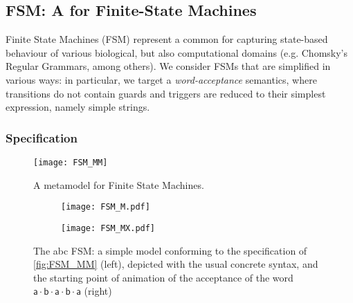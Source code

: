 \subsection{\textsf{FSM}: A \DSL for Finite-State Machines}
\label{sec:Examples:FSM}

Finite State Machines (FSM) represent a common \DSL for capturing state-based 
behaviour of various biological, but also computational domains (e.g. Chomsky's 
Regular Grammars, among others). We consider
FSMs that are simplified in various ways: in particular, we target a
\emph{word-acceptance} semantics, where transitions do not contain guards and 
triggers are reduced to their simplest expression, namely simple strings.

\subsubsection{Specification}
\label{sec:Examples:FSM:Specification}

\begin{figure}[t]%
   \centering
   \texttt{[image: FSM\_MM]}%
   \caption{A metamodel for Finite State Machines.}%
   \label{fig:FSM_MM}%
\end{figure}

\begin{figure}[t]%
   \centering
   \begin{subfigure}[b]{0.45\columnwidth}
      \centering
      \texttt{[image: FSM\_M.pdf]}%
   \end{subfigure}
   \hfill
   \begin{subfigure}[b]{0.45\columnwidth}
      \centering
      \texttt{[image: FSM\_MX.pdf]}%
   \end{subfigure}
  \caption{The \textsf{abc} FSM: a simple model conforming to the specification
   of \autoref{fig:FSM_MM} (left), depicted with the usual concrete syntax, and 
   the starting point of animation of the acceptance of the word 
   $\mathsf{a\cdot b \cdot a \cdot b \cdot a}$ (right)}%
   \label{fig:FSM_M}%
\end{figure}



